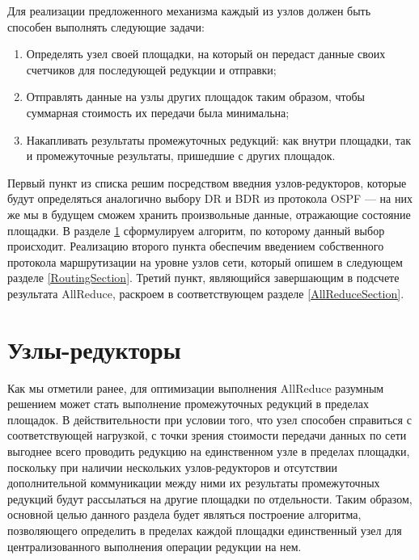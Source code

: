 \documentclass{article}
\theoremstyle{plain}
\theoremstyle{plain}
\theoremstyle{plain}
\theoremstyle{plain}
\theoremstyle{definition}
\theoremstyle{remark}
\theoremstyle{plain}
\begin{document}
Для реализации предложенного механизма каждый из узлов должен быть способен выполнять следующие задачи:

\begin{enumerate}
    \item Определять узел своей площадки, на который он передаст данные своих счетчиков для последующей редукции и отправки;
    
    \item Отправлять данные на узлы других площадок таким образом, чтобы суммарная стоимость их передачи была минимальна;
    
    \item Накапливать результаты промежуточных редукций: как внутри площадки, так и промежуточные результаты, пришедшие с других площадок.
\end{enumerate}

Первый пункт из списка решим посредством введния узлов-редукторов, которые будут определяться аналогично выбору DR и BDR из протокола OSPF \cite[с.~75]{RFC2328} --- на них же мы в будущем сможем хранить произвольные данные, отражающие состояние площадки. В разделе \ref{ReducersSection} сформулируем алгоритм, по которому данный выбор происходит. Реализацию второго пункта обеспечим введением собственного протокола маршрутизации на уровне узлов сети, который опишем в следующем разделе \ref{RoutingSection}. Третий пункт, являющийся завершающим в подсчете результата AllReduce, раскроем в соответствующем разделе \ref{AllReduceSection}.

\section{Узлы-редукторы}
\label{ReducersSection}

Как мы отметили ранее, для оптимизации выполнения AllReduce разумным решением может стать выполнение промежуточных редукций в пределах площадок. В действительности при условии того, что узел способен справиться с соответствующей нагрузкой, с точки зрения стоимости передачи данных по сети выгоднее всего проводить редукцию на единственном узле в пределах площадки, поскольку при наличии нескольких узлов-редукторов и отсутствии дополнительной коммуникации между ними их результаты промежуточных редукций будут рассылаться на другие площадки по отдельности. Таким образом, основной целью данного раздела будет являться построение алгоритма, позволяющего определить в пределах каждой площадки единственный узел для централизованного выполнения операции редукции на нем.
\end{document}

